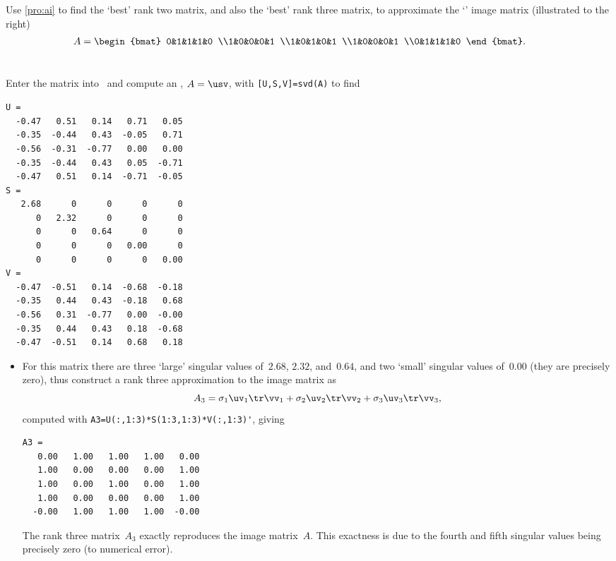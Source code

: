 \begin{example} \label{eg:bullseyemat}
Use \cref{pro:ai} to find the `best' rank two matrix, and also the `best' rank three matrix, to approximate the `' image matrix (illustrated to the right)
\begin{align*}&
A=\begin{bmat} 0&1&1&1&0
\\1&0&0&0&1
\\1&0&1&0&1
\\1&0&0&0&1
\\0&1&1&1&0 \end{bmat}.
&&\raisebox{-5ex}{}
\end{align*}
\begin{solution} 
Enter the matrix into \script\ and compute an \svd, \(A=\usv\), with \verb|[U,S,V]=svd(A)| to find \twodp
\begin{verbatim}
U =
  -0.47   0.51   0.14   0.71   0.05
  -0.35  -0.44   0.43  -0.05   0.71
  -0.56  -0.31  -0.77   0.00   0.00
  -0.35  -0.44   0.43   0.05  -0.71
  -0.47   0.51   0.14  -0.71  -0.05
S =
   2.68      0      0      0      0
      0   2.32      0      0      0
      0      0   0.64      0      0
      0      0      0   0.00      0
      0      0      0      0   0.00
V =
  -0.47  -0.51   0.14  -0.68  -0.18
  -0.35   0.44   0.43  -0.18   0.68
  -0.56   0.31  -0.77   0.00  -0.00
  -0.35   0.44   0.43   0.18  -0.68
  -0.47  -0.51   0.14   0.68   0.18
\end{verbatim}
\setbox\ajrqrbox\hbox{}%
\marginajrbox%
\begin{itemize}
\item For this matrix there are three `large' singular values of~\(2.68\), \(2.32\), and~\(0.64\), and two `small' singular values of~\(0.00\) (they are precisely zero), thus construct a rank three approximation to the image matrix as
\begin{equation*}
A_3=\sigma_1\uv_1\tr\vv_1+\sigma_2\uv_2\tr\vv_2+\sigma_3\uv_3\tr\vv_3,
\end{equation*}
computed with \verb|A3=U(:,1:3)*S(1:3,1:3)*V(:,1:3)'|, giving \twodp
\begin{verbatim}
A3 =
   0.00   1.00   1.00   1.00   0.00
   1.00   0.00   0.00   0.00   1.00
   1.00   0.00   1.00   0.00   1.00
   1.00   0.00   0.00   0.00   1.00
  -0.00   1.00   1.00   1.00  -0.00
\end{verbatim}
The rank three matrix~\(A_3\) exactly reproduces the image matrix~\(A\). 
This exactness is due to the  fourth and fifth singular values being precisely zero (to numerical error).


\end{itemize}
\end{solution}
\end{example}
